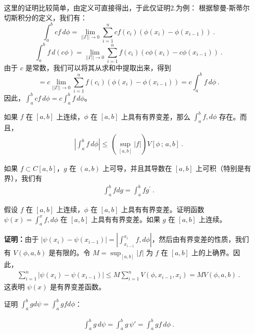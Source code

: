 这里的证明比较简单，由定义可直接得出，于此仅证明2.为例：
根据黎曼-斯蒂尔切斯积分的定义，我们有：
   \[
   \int_{a}^{b}cf\,d\phi = \lim_{||\Gamma|| \to 0} \sum_{i=1}^{n} cf(c_i)(\phi(x_i) - \phi(x_{i-1}))~.
   \]
   \[
   \int_{a}^{b}f\,d(c\phi) = \lim_{||\Gamma|| \to 0} \sum_{i=1}^{n} f(c_i)(c\phi(x_i) - c\phi(x_{i-1}))~.
   \]
   由于 $c$ 是常数，我们可以将其从求和中提取出来，得到
\[
   = c\lim_{||\Gamma|| \to 0} \sum_{i=1}^{n} f(c_i)(\phi(x_i) - \phi(x_{i-1})) = c\int_{a}^{b}f\,d\phi~.
   \]
   因此，$\int_{a}^{b}cf\,d\phi=c\int_{a}^{b}f\,d\phi$。
\begin{theorem}{}
如果 $f$ 在 $[a,b]$ 上连续，$\phi$ 在 $[a,b]$ 上具有有界变差，那么 $ \int_{a}^{b}f,d\phi$ 存在。而且，
\begin{align}
  \left|\int_{a}^{b}f\,d\phi\right|\leq\,(\sup_{[a,b]}|f|)V[\phi\,;\,a,b]~.
\end{align}

\end{theorem}

\begin{theorem}{}
如果 $f\subset C[a,b]$，$g$ 在 $(a,b)$ 上可导，并且其导数在 $[a,b]$ 上可积（特别是有界），我们有
\begin{align}
\int_{a}^{b}fdg=\int_{a}^{b}fg^{\prime}~.
\end{align}
\end{theorem}

\begin{example}{假设 $f$ 在 $[a,b]$ 上连续，$\phi$ 在 $[a,b]$ 上具有有界变差。证明函数 $\psi(x)=\int_{a}^{x}f,d\phi$ 在 $[a,b]$ 上具有有界变差。如果 $g$ 在 $[a,b]$ 上连续。}

\textbf{证明：}由于 $ |\psi(x_i) - \psi(x_{i-1})| = \left|\int_{x_{i-1}}^{x_i}f , d\phi\right| $，然后由有界变差的性质，我们有 $ V(\phi, a, b) $ 是有限的。令 $ M = \sup_{[a,b]}|f| $ 为 $ f $ 在 $ [a, b] $ 上的上确界。因此， \begin{align} \sum_{i=1}^n |\psi(x_i) - \psi(x_{i-1})| \leq M \sum_{i=1}^n V(\phi,x_{i-1},x_i) = MV(\phi,a,b)~. \end{align} 这表明 $ \psi(x) $ 是有界变差函数。

证明 $\int_{a}^{b}gd\psi=\int_{a}^{b}gfd\phi$：

\begin{align}
\int_{a}^{b}g\,d\psi=\int_{a}^{b}g\,\psi'=\int_{a}^{b}gf\,d\phi~.
\end{align}
\end{example}


